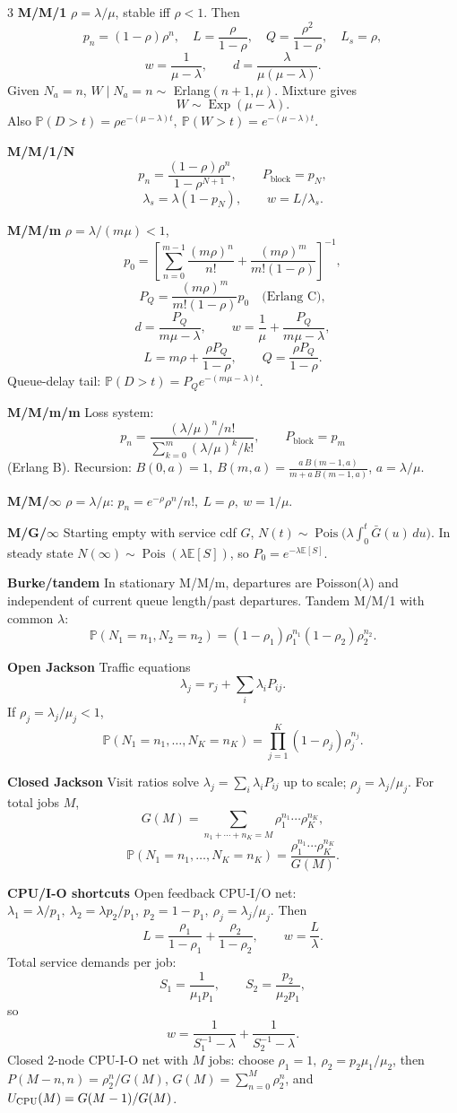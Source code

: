 \documentclass[a4paper,8pt,fleqn]{extarticle}
\newcommand{\E}{\mathbb{E}}
\newcommand{\PP}{\mathbb{P}}
\newcommand{\1}{\mathbf{1}}
\newcommand{\sub}[1]{\textbf{#1} }
\DeclareMathOperator{\Pois}{Pois}
\DeclareMathOperator{\Exp}{Exp}
\begin{document}
\begin{multicols}{3}
\sub{M/M/1} \(\rho=\lambda/\mu\), stable iff \(\rho<1\). Then
\[
p_n=(1-\rho)\rho^n,\quad L=\frac{\rho}{1-\rho},\quad Q=\frac{\rho^2}{1-\rho},\quad L_s=\rho,
\]
\[
w=\frac{1}{\mu-\lambda},\qquad d=\frac{\lambda}{\mu(\mu-\lambda)}.
\]
Given \(N_a=n\), \(W\mid N_a=n\sim\) Erlang\((n+1,\mu)\). Mixture gives
\[
W\sim \Exp(\mu-\lambda).
\]
Also
\(\PP(D>t)=\rho e^{-(\mu-\lambda)t},\ \PP(W>t)=e^{-(\mu-\lambda)t}\).

\sub{M/M/1/N} 
\[
p_n=\frac{(1-\rho)\rho^n}{1-\rho^{N+1}},\qquad P_{\text{block}}=p_N,
\]
\[
\lambda_s=\lambda(1-p_N),\qquad w=L/\lambda_s.
\]

\sub{M/M/m} \(\rho=\lambda/(m\mu)<1\),
\[
p_0=\left[\sum_{n=0}^{m-1}\frac{(m\rho)^n}{n!}+\frac{(m\rho)^m}{m!(1-\rho)}\right]^{-1},
\]
\[
P_Q=\frac{(m\rho)^m}{m!(1-\rho)}p_0\quad\text{(Erlang C)},
\]
\[
d=\frac{P_Q}{m\mu-\lambda},\qquad
w=\frac{1}{\mu}+\frac{P_Q}{m\mu-\lambda},
\]
\[
L=m\rho+\frac{\rho P_Q}{1-\rho},\qquad Q=\frac{\rho P_Q}{1-\rho}.
\]
Queue-delay tail: \(\PP(D>t)=P_Q e^{-(m\mu-\lambda)t}\).

\sub{M/M/m/m} Loss system:
\[
p_n=\frac{(\lambda/\mu)^n/n!}{\sum_{k=0}^m (\lambda/\mu)^k/k!},\qquad
P_{\text{block}}=p_m
\]
(Erlang B). Recursion: \(B(0,a)=1,\ B(m,a)=\frac{a\,B(m-1,a)}{m+a\,B(m-1,a)}\), \(a=\lambda/\mu\).

\sub{M/M/\(\infty\)} \(\rho=\lambda/\mu\): \(p_n=e^{-\rho}\rho^n/n!,\ L=\rho,\ w=1/\mu.\)

\sub{M/G/\(\infty\)} Starting empty with service cdf \(G\), \(N(t)\sim\Pois\!\big(\lambda\int_0^t \bar{G}(u)\,du\big)\). In steady state \(N(\infty)\sim\Pois(\lambda\E[S])\), so \(P_0=e^{-\lambda\E[S]}\).

\sub{Burke/tandem} In stationary M/M/m, departures are Poisson(\(\lambda\)) and independent of current queue length/past departures. Tandem M/M/1 with common \(\lambda\):
\[
\PP(N_1=n_1,N_2=n_2)=(1-\rho_1)\rho_1^{n_1}(1-\rho_2)\rho_2^{n_2}.
\]

\sub{Open Jackson} Traffic equations
\[
\lambda_j=r_j+\sum_i \lambda_i P_{ij}.
\]
If \(\rho_j=\lambda_j/\mu_j<1\),
\[
\PP(N_1=n_1,\dots,N_K=n_K)=\prod_{j=1}^K (1-\rho_j)\rho_j^{n_j}.
\]

\sub{Closed Jackson} Visit ratios solve \(\lambda_j=\sum_i \lambda_i P_{ij}\) up to scale; \(\rho_j=\lambda_j/\mu_j\). For total jobs \(M\),
\[
G(M)=\sum_{n_1+\cdots+n_K=M}\rho_1^{n_1}\cdots \rho_K^{n_K},
\]
\[
\PP(N_1=n_1,\dots,N_K=n_K)=\frac{\rho_1^{n_1}\cdots \rho_K^{n_K}}{G(M)}.
\]

\sub{CPU/I-O shortcuts} Open feedback CPU-I/O net: \(\lambda_1=\lambda/p_1,\ \lambda_2=\lambda p_2/p_1,\ p_2=1-p_1,\ \rho_j=\lambda_j/\mu_j\). Then
\[
L=\frac{\rho_1}{1-\rho_1}+\frac{\rho_2}{1-\rho_2},\qquad w=\frac{L}{\lambda}.
\]
Total service demands per job:
\[
S_1=\frac{1}{\mu_1p_1},\qquad S_2=\frac{p_2}{\mu_2p_1},
\]
so
\[
w=\frac{1}{S_1^{-1}-\lambda}+\frac{1}{S_2^{-1}-\lambda}.
\]
Closed 2-node CPU-I-O net with \(M\) jobs: choose \(\rho_1=1,\ \rho_2=p_2\mu_1/\mu_2\), then \(P(M-n,n)=\rho_2^n/G(M)\), \(G(M)=\sum_{n=0}^M\rho_2^n\), and \(U_{\rm CPU}(M)=G(M-1)/G(M)\).


\end{multicols}
\end{document}
